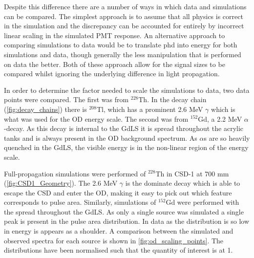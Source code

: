 

\par
Despite this difference there are a number of ways in which data and simulations can be compared.
The simplest approach is to assume that all physics is correct in the simulation and the discrepancy can be accounted for entirely by incorrect linear scaling in the simulated PMT response.
An alternative approach to comparing simulations to data would be to translate phd into energy for both simulations and data, though generally the less manipulation that is performed on data the better.
Both of these approach allow for the signal sizes to be compared whilst ignoring the underlying difference in light propagation.

\par
In order to determine the factor needed to scale the simulations to data, two data points were compared.
The first was from ${}^{228}$Th.
In the decay chain (\autoref{fig:decay_chains}) there is ${}^{208}$Tl, which has a prominent 2.6 MeV $\gamma$ which is what was used for the OD energy scale.
The second was from ${}^{152}$Gd, a 2.2 MeV $\alpha$-decay.
As this decay is internal to the GdLS it is spread throughout the acrylic tanks and is always present in the OD background spectrum.
As $\alpha$s are so heavily quenched in the GdLS, the visible energy is in the non-linear region of the energy scale.

\par
Full-propagation simulations were performed of ${}^{228}$Th in CSD-1 at 700 mm (\autoref{fig:CSD1_Geometry}).
The 2.6 MeV $\gamma$ is the dominate decay which is able to escape the CSD and enter the OD, making it easy to pick out which feature corresponds to pulse area.
Similarly, simulations of ${}^{152}$Gd were performed with the spread throughout the GdLS.
As only a single source was simulated a single peak is present in the pulse area distribution.
In data as the distribution is so low in energy is appears as a shoulder.
A comparison between the simulated and observed spectra for each source is shown in \autoref{fig:od_scaling_points}.
The distributions have been normalised such that the quantity of interest is at 1.

